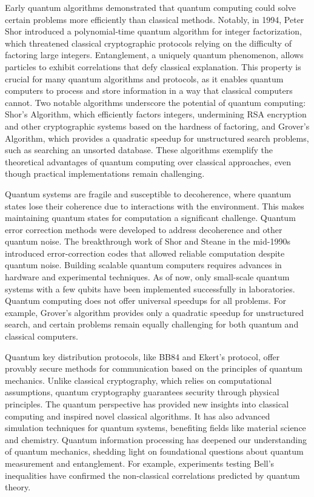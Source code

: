 \documentclass[11pt]{article}
\theoremstyle{definition}
\begin{document}
Early quantum algorithms demonstrated that quantum computing could solve certain problems more efficiently than classical methods. Notably, in 1994, Peter Shor introduced a polynomial-time quantum algorithm for integer factorization, which threatened classical cryptographic protocols relying on the difficulty of factoring large integers. Entanglement, a uniquely quantum phenomenon, allows particles to exhibit correlations that defy classical explanation. This property is crucial for many quantum algorithms and protocols, as it enables quantum computers to process and store information in a way that classical computers cannot. Two notable algorithms underscore the potential of quantum computing: Shor’s Algorithm, which efficiently factors integers, undermining RSA encryption and other cryptographic systems based on the hardness of factoring, and Grover’s Algorithm, which provides a quadratic speedup for unstructured search problems, such as searching an unsorted database. These algorithms exemplify the theoretical advantages of quantum computing over classical approaches, even though practical implementations remain challenging.

Quantum systems are fragile and susceptible to decoherence, where quantum states lose their coherence due to interactions with the environment. This makes maintaining quantum states for computation a significant challenge. Quantum error correction methods were developed to address decoherence and other quantum noise. The breakthrough work of Shor and Steane in the mid-1990s introduced error-correction codes that allowed reliable computation despite quantum noise. Building scalable quantum computers requires advances in hardware and experimental techniques. As of now, only small-scale quantum systems with a few qubits have been implemented successfully in laboratories. Quantum computing does not offer universal speedups for all problems. For example, Grover’s algorithm provides only a quadratic speedup for unstructured search, and certain problems remain equally challenging for both quantum and classical computers.

Quantum key distribution protocols, like BB84 and Ekert’s protocol, offer provably secure methods for communication based on the principles of quantum mechanics. Unlike classical cryptography, which relies on computational assumptions, quantum cryptography guarantees security through physical principles. The quantum perspective has provided new insights into classical computing and inspired novel classical algorithms. It has also advanced simulation techniques for quantum systems, benefiting fields like material science and chemistry. Quantum information processing has deepened our understanding of quantum mechanics, shedding light on foundational questions about quantum measurement and entanglement. For example, experiments testing Bell’s inequalities have confirmed the non-classical correlations predicted by quantum theory.
\end{document}
